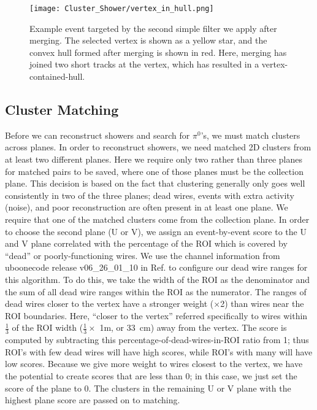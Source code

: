 \documentclass{article}
\begin{document}
\begin{figure}[H]
\centering
\texttt{[image: Cluster\_Shower/vertex\_in\_hull.png]}
\caption{Example event targeted by the second simple filter we apply after merging. The selected vertex is shown as a yellow star, and the convex hull formed after merging is shown in red. Here, merging has joined two short tracks at the vertex, which has resulted in a vertex-contained-hull. }
\label{fig:vertex_in_hull}
\end{figure}


\subsection{Cluster Matching}
Before we can reconstruct showers and search for $\pi^{0}$'s, we must match clusters across planes.  In order to reconstruct showers, we need matched 2D clusters from at least two different planes. Here we require only two rather than three planes for matched pairs to be saved, where one of those planes must be the collection plane. This decision is based on the fact that clustering generally only goes well consistently in two of the three planes; dead wires, events with extra activity (noise), and poor reconstruction are often present in at least one plane. We require that one of the matched clusters come from the collection plane.  In order to choose the second plane (U or V), we assign an event-by-event score to the U and V plane correlated with the percentage of the ROI which is covered by ``dead'' or poorly-functioning wires. We use the channel information from uboonecode release v06\_26\_01\_10 in Ref. \cite{bib:calibration_ref} to configure our dead wire ranges for this algorithm. 
 To do this, we take the width of the ROI as the denominator and the sum of all dead wire ranges within the ROI as the numerator. The ranges of dead wires closer to the vertex have a stronger weight ($\times$2) than wires near the ROI boundaries.  Here, “closer to the vertex” referred specifically to wires within $\frac{1}{3}$ of the ROI width ($\frac{1}{3} \times$ 1m, or 33~cm) away from the vertex. The score is computed by subtracting this percentage-of-dead-wires-in-ROI ratio from 1; thus ROI's with few dead wires will have high scores, while ROI's with many will have low scores.  Because we give more weight to wires closest to the vertex, we have the potential to create scores that are less than 0; in this case, we just set the score of the plane to 0. The clusters in the remaining U or V plane with the highest plane score are passed on to matching. 
\end{document}
